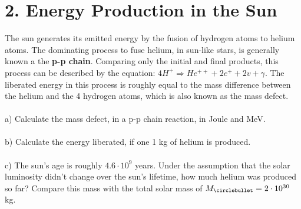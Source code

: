 \section*{2. Energy Production in the Sun}

The sun generates its emitted energy by the fusion of hydrogen atoms to helium atoms. The dominating 
process to fuse helium, in sun-like stars, is generally known a the \textbf{p-p chain}. Comparing only
the initial and final products, this process can be described by the equation: 
$4H^+ \Rightarrow He^{++} + 2e^+ + 2v + \gamma$. The liberated energy in this process is roughly equal
to the mass difference between the helium and the 4 hydrogen atoms, which is also known as the mass 
defect.\\
\\
a) Calculate the mass defect, in a p-p chain reaction, in Joule and MeV.\\
\\
b) Calculate the energy liberated, if one 1 kg of helium is produced.\\
\\
c) The sun's age is roughly $4.6 \cdot 10^9$ years. Under the assumption that the solar luminosity didn't
change over the sun's lifetime, how much helium was produced so far? Compare this mass with the total 
solar mass of $M_\circlebullet = 2 \cdot 10^{30}$ kg.\\
\\
